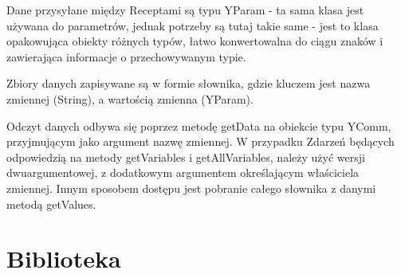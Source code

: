\documentclass[11pt,a4paper,polish,thesis]{dcsbook}
\begin{document}
Dane przysyłane między Receptami są typu YParam - ta sama klasa jest używana do parametrów, jednak potrzeby są tutaj takie same - jest to klasa opakowująca obiekty różnych typów, łatwo konwertowalna do ciągu znaków i zawierająca informacje o przechowywanym typie. 

Zbiory danych zapisywane są w formie słownika, gdzie kluczem jest nazwa zmiennej (String), a wartością zmienna (YParam). 

Odczyt danych odbywa się poprzez metodę getData na obiekcie typu YComm, przyjmującym jako argument nazwę zmiennej. W przypadku Zdarzeń będących odpowiedzią na metody getVariables i getAllVariables, należy użyć wersji dwuargumentowej, z dodatkowym argumentem określającym właściciela zmiennej. Innym sposobem dostępu jest pobranie całego słownika z danymi metodą getValues.
 
\section{Biblioteka}
\end{document}
